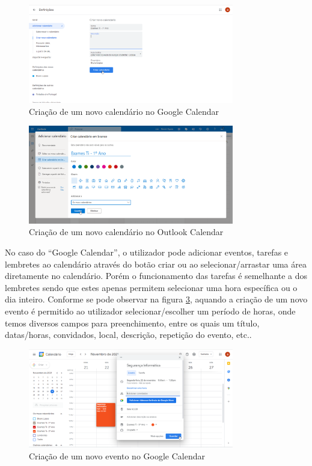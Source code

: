 \documentclass[11pt, twoside]{report}
\begin{document}
	\begin{figure}[H] 
		\centering
		\includegraphics[width=0.8\textwidth,height=0.8\textheight,keepaspectratio]{image/estadodearte/criacao_calendario_google}
		\caption{Criação de um novo calendário no Google Calendar}
		\label{googlecalendar}
	\end{figure}
	
	\begin{figure}[H] 
		\centering
		\includegraphics[width=0.8\textwidth,height=0.8\textheight,keepaspectratio]{image/estadodearte/criacao_calendario_outlook}
		\caption{Criação de um novo calendário no Outlook Calendar}
		\label{calendariooutlook}
	\end{figure}
	
	No caso do ``Google Calendar'', o utilizador pode adicionar eventos, tarefas e lembretes ao calendário através do botão criar ou ao selecionar/arrastar uma área diretamente no calendário. Porém o funcionamento das tarefas é semelhante a dos lembretes sendo que estes apenas permitem selecionar uma hora específica ou o dia inteiro. Conforme se pode observar na figura \ref{googlenovoevento}, aquando a criação de um novo evento é permitido ao utilizador selecionar/escolher um período de horas, onde temos diversos campos para preenchimento, entre os quais um título, datas/horas, convidados, local, descrição, repetição do evento, etc..
	
	\begin{figure}[H] 
		\centering
		\includegraphics[width=0.8\textwidth,height=0.8\textheight,keepaspectratio]{image/estadodearte/criacao_evento_google}
		\caption{Criação de um novo evento no Google Calendar}
		\label{googlenovoevento}
	\end{figure}
	
\end{document}
